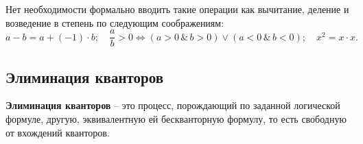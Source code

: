 \begin{remark}
    Нет необходимости формально вводить такие операции как вычитание, деление и возведение в степень по следующим соображениям:
    \begin{equation*}
        a-b=a+(-1)\cdot b; \quad \frac{a}{b} > 0 \Leftrightarrow (a > 0 \, \& \, b > 0) \lor (a < 0 \, \& \, b < 0); \quad x^2 = x \cdot x.
    \end{equation*}
\end{remark}

\subsection{Элиминация кванторов}

\begin{definition}
    \textbf{Элиминация кванторов} -- это процесс, порождающий по заданной логической формуле, другую, эквивалентную ей бескванторную формулу, то есть свободную от вхождений кванторов.
\end{definition}

